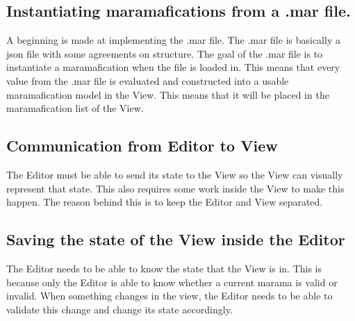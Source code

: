 \documentclass[10pt]{extarticle} %
\begin{document}
    \subsection{Instantiating maramafications from a .mar file.}
    A beginning is made at implementing the .mar file.
    The .mar file is basically a json file with some agreements on structure.
    The goal of the .mar file is to instantiate a maramafication when the file is loaded in.
    This means that every value from the .mar file is evaluated and constructed into a usable maramafication model in the View.
    This means that it will be placed in the maramafication list of the View.
    \subsection{Communication from Editor to View}
    The Editor must be able to send its state to the View so the View can visually represent that state.
    This also requires some work inside the View to make this happen.
    The reason behind this is to keep the Editor and View separated.
    \subsection{Saving the state of the View inside the Editor}
    The Editor needs to be able to know the state that the View is in.
    This is because only the Editor is able to know whether a current marama is valid or invalid.
    When something changes in the view, the Editor needs to be able to validate this change and change its state accordingly.

    \newpage
    
    
\end{document}
